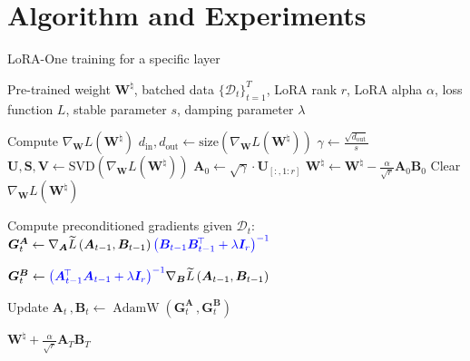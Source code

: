 \section{Algorithm and Experiments}
\label{sec:algoexp}




\newcommand{\algorithmicinitialize}{\textbf{Initialize:}}
\newcommand{\Initialize}{\item[\algorithmicinitialize]}
\newcommand{\algorithmicinputy}{\textbf{Input:}}
\newcommand{\Input}{\item[\algorithmicinputy]}
\newcommand{\algorithmictrain}{\textbf{Train:}}
\newcommand{\Train}{\item[\algorithmictrain]}
\newcommand{\algorithmicre}{\textbf{Return:}}
\newcommand{\Return}{\item[\algorithmicre]}
\begin{algorithm}[t]
\caption{LoRA-One training for a specific layer}
\label{alg:lora_one_training}
\begin{algorithmic}[1]
\Input Pre-trained weight $\bm W^\natural$, batched data $\{\mathcal{D}_t\}_{t=1}^{T}$, LoRA rank $r$, LoRA alpha $\alpha$, loss function $L$, stable parameter $s$, damping parameter $\lambda$
\Initialize
\STATE Compute $\nabla_{\bm W} L(\bm W^\natural)$
\STATE $d_{\text{in}}, d_{\text{out}} \gets \text{size}(\nabla_{\bm W} L(\bm W^\natural))$
\STATE $\gamma \gets \frac{\sqrt{d_\text{out}}}{s}$
\STATE $\bm U, \bm S, \bm V \gets \text{SVD}\left(\nabla_{\bm W} L(\bm W^\natural)\right)$
\STATE $\bm A_0 \gets \sqrt{\gamma}\cdot\bm U_{[:,1:r]}$
\STATE $\bm W^\natural \gets \bm W^\natural - \frac{\alpha}{\sqrt{r}} \bm A_0 \bm B_0$
\STATE Clear $\nabla_{\bm W} L(\bm W^\natural)$
\Train
{}
\STATE Compute preconditioned gradients given $\mathcal{D}_t$:\\
$\bm G^{\bm A}_t \gets \nabla_{\bm A}\widetilde{L}\left(\bm A_{t-1},\bm B_{t-1}\right){\color{blue}\left(\bm B_{t-1}\bm B^{\!\top}_{t-1}+\lambda \bm I_r\right)^{-1}}$

$
\bm G^{\bm B}_t \gets {\color{blue}\left(\bm A^{\!\top}_{t-1}\bm A_{t-1}+\lambda \bm I_r\right)^{-1}}\nabla_{\bm B}\widetilde{L}\left(\bm A_{t-1},\bm B_{t-1}\right)$

\STATE Update $\bm A_t\,,\bm B_t \gets \operatorname{AdamW}\left(\bm G^{\bm A}_t\,,\bm G^{\bm B}_t\right)$
\ENDFOR
\Return $\bm W^\natural + \frac{\alpha}{\sqrt{r}} \bm A_{T} \bm B_{T}$
\end{algorithmic}
\end{algorithm}

